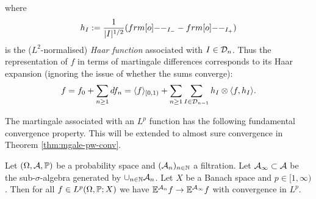 \begin{example}
\begin{equation*}
  \end{equation*}
  where
  \begin{equation*}
    h_I := \frac{1}{|I|^{1/2}} (\1_{I_-} - \1_{I_+})
  \end{equation*}
  is the ($L^2$-normalised) \emph{Haar function} associated with $I \in \mc{D}_{n}$.
  Thus the representation of $f$ in terms of martingale differences corresponds to its Haar expansion (ignoring the issue of whether the sums converge):
  \begin{equation*}
    f = f_0 + \sum_{n \geq 1} df_{n} = \langle f \rangle_{[0,1)} + \sum_{n \geq 1} \sum_{I \in \mc{D}_{n-1}} h_I \otimes \langle f, h_I \rangle. 
  \end{equation*}

\end{example}

The martingale associated with an $L^p$ function has the following fundamental convergence property.
This will be extended to almost sure convergence in Theorem \ref{thm:mgale-pw-conv}. 

\begin{thm}\label{thm:mgale-conv-Lp}
  Let $(\Omega, \mc{A}, \P)$ be a probability space and $(\mc{A}_{n})_{n \in \N}$ a filtration.
  Let $\mc{A}_{\infty} \subset \mc{A}$ be the sub-$\sigma$-algebra generated by $\cup_{n \in \N} \mc{A}_{n}$.
  Let $X$ be a Banach space and $p \in [1,\infty)$.
  Then for all $f \in L^p(\Omega,\P;X)$ we have $\E^{\mc{A}_{n}} f \to \E^{\mc{A}_\infty} f$ with convergence in $L^p$.
\end{thm}

